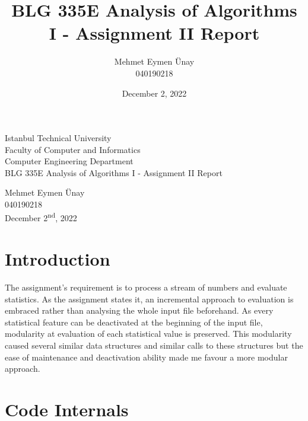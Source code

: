 \documentclass[a4paper, 12pt, titlepage]{article}
\title{BLG 335E Analysis of Algorithms I - Assignment II Report}
\author{Mehmet Eymen Ünay \\ 040190218}
\date{December 2, 2022}
\begin{document}


\begin{titlepage}
	\begin{center}
		\large{Istanbul Technical University \\ Faculty of Computer and Informatics \\ Computer Engineering Department} \\
		\vspace{150pt}
		\Large{BLG 335E Analysis of Algorithms I - Assignment II Report}  \\
		\vspace{30pt}

		\large{Mehmet Eymen Ünay \\ 040190218} \\
		\vspace{\fill} %
		\large{December 2\textsuperscript{nd}, 2022}
	\end{center}
\end{titlepage}
\newpage
\tableofcontents
\newpage

\section{Introduction}
The assignment's requirement is to process a stream of numbers and evaluate statistics. As the assignment states it, an incremental approach to evaluation is embraced rather than analysing the whole input file beforehand. As every statistical feature can be deactivated at the beginning of the input file, modularity at evaluation of each statistical value is preserved. This modularity caused several similar data structures and similar calls to these structures but the ease of maintenance and deactivation ability made me favour a more modular approach. 

\section{Code Internals}
\end{document}
